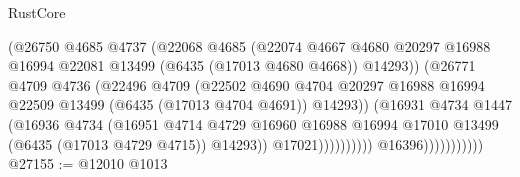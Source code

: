 \begin{lexlean}{RustCore}
\begin{coremodule}
                                        (@26750
                                          @4685
                                          @4737
                                          (@22068
                                            @4685
                                            (@22074
                                              @4667
                                              @4680
                                              @20297
                                              @16988
                                              @16994
                                              @22081
                                              @13499
                                              (@6435 (@17013 @4680 @4668))
                                              @14293))
                                          (@26771
                                            @4709
                                            @4736
                                            (@22496
                                              @4709
                                              (@22502
                                                @4690
                                                @4704
                                                @20297
                                                @16988
                                                @16994
                                                @22509
                                                @13499
                                                (@6435 (@17013 @4704 @4691))
                                                @14293))
                                            (@16931
                                              @4734
                                              @1447
                                              (@16936
                                                @4734
                                                (@16951
                                                  @4714
                                                  @4729
                                                  @16960
                                                  @16988
                                                  @16994
                                                  @17010
                                                  @13499
                                                  (@6435 (@17013 @4729 @4715))
                                                  @14293))
                                              @17021))))))))))
                          @16396)))))))))))
@27155 := @12010 @1013

\end{coremodule}
\end{lexlean}

